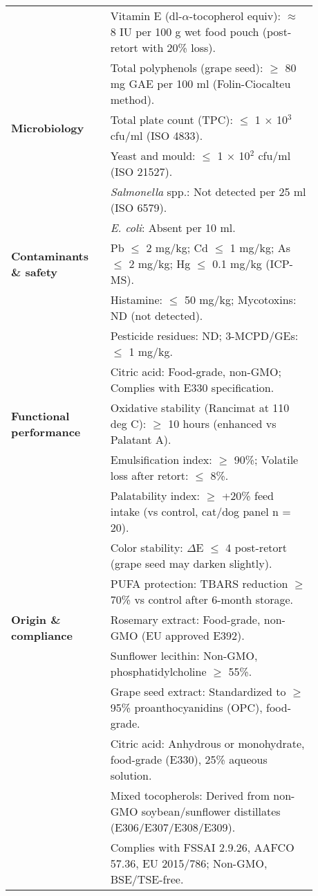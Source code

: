 \begin{adjustbox}{max width=\textwidth}
\begin{tabular}{@{}p{0.28\linewidth}p{0.60\linewidth}@{}}
& Vitamin E (dl-$\alpha$-tocopherol equiv): $\approx$ 8 IU per 100 g wet food pouch (post-retort with 20\% loss).\\
& Total polyphenols (grape seed): $\geq$ 80 mg GAE per 100 ml (Folin-Ciocalteu method).\\
\midrule
\textbf{Microbiology} &
Total plate count (TPC): $\leq$ 1 $\times$ 10$^3$ cfu/ml (ISO 4833).\\
& Yeast and mould: $\leq$ 1 $\times$ 10$^2$ cfu/ml (ISO 21527).\\
& \textit{Salmonella} spp.: Not detected per 25 ml (ISO 6579).\\
& \textit{E. coli}: Absent per 10 ml.\\
\midrule
\textbf{Contaminants \& safety} &
Pb $\leq$ 2 mg/kg; Cd $\leq$ 1 mg/kg; As $\leq$ 2 mg/kg; Hg $\leq$ 0.1 mg/kg (ICP-MS).\\
& Histamine: $\leq$ 50 mg/kg; Mycotoxins: ND (not detected).\\
& Pesticide residues: ND; 3-MCPD/GEs: $\leq$ 1 mg/kg.\\
& Citric acid: Food-grade, non-GMO; Complies with E330 specification.\\
\midrule
\textbf{Functional performance} &
Oxidative stability (Rancimat at 110 deg C): $\geq$ 10 hours (enhanced vs Palatant A).\\
& Emulsification index: $\geq$ 90\%; Volatile loss after retort: $\leq$ 8\%.\\
& Palatability index: $\geq$ +20\% feed intake (vs control, cat/dog panel n = 20).\\
& Color stability: $\Delta$E $\leq$ 4 post-retort (grape seed may darken slightly).\\
& PUFA protection: TBARS reduction $\geq$ 70\% vs control after 6-month storage.\\
\midrule
\textbf{Origin \& compliance} &
Rosemary extract: Food-grade, non-GMO (EU approved E392).\\
& Sunflower lecithin: Non-GMO, phosphatidylcholine $\geq$ 55\%.\\
& Grape seed extract: Standardized to $\geq$ 95\% proanthocyanidins (OPC), food-grade.\\
& Citric acid: Anhydrous or monohydrate, food-grade (E330), 25\% aqueous solution.\\
& Mixed tocopherols: Derived from non-GMO soybean/sunflower distillates (E306/E307/E308/E309).\\
& Complies with FSSAI 2.9.26, AAFCO 57.36, EU 2015/786; Non-GMO, BSE/TSE-free.\\

\end{tabular}
\end{adjustbox}

